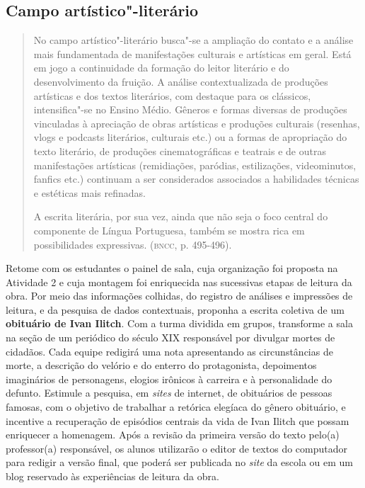 \documentclass[12pt]{extarticle}
\begin{document}
\subsection{Campo artístico"-literário}

\begin{quote}
No campo artístico"-literário busca"-se a ampliação do contato e a
análise mais fundamentada de manifestações culturais e artísticas em
geral. Está em jogo a continuidade da formação do leitor literário e do
desenvolvimento da fruição. A análise contextualizada de produções
artísticas e dos textos literários, com destaque para os clássicos,
intensifica"-se no Ensino Médio. Gêneros e formas diversas de produções
vinculadas à apreciação de obras artísticas e produções culturais
(resenhas, vlogs e podcasts literários, culturais etc.) ou a formas de
apropriação do texto literário, de produções cinematográficas e teatrais
e de outras manifestações artísticas (remidiações, paródias,
estilizações, videominutos, fanfics etc.) continuam a ser considerados
associados a habilidades técnicas e estéticas mais refinadas.

A escrita literária, por sua vez, ainda que não seja o foco central do
componente de Língua Portuguesa, também se mostra rica em possibilidades
expressivas. (\textsc{bncc}, p. 495-496).
\end{quote}

Retome com os estudantes o painel de sala, cuja organização foi
proposta na Atividade 2 e cuja montagem foi enriquecida nas sucessivas
etapas de leitura da obra. Por meio das informações colhidas, do
registro de análises e impressões de leitura, e da pesquisa de dados
contextuais, proponha a escrita coletiva de um \textbf{obituário de
Ivan Ilitch}. Com a turma dividida em grupos, transforme a sala na
seção de um periódico do século XIX responsável por divulgar mortes de
cidadãos. Cada equipe redigirá uma nota apresentando as circunstâncias
de morte, a descrição do velório e do enterro do protagonista,
depoimentos imaginários de personagens, elogios irônicos à carreira e
à personalidade do defunto. Estimule a pesquisa, em \emph{sites} de
internet, de obituários de pessoas famosas, com o objetivo de
trabalhar a retórica elegíaca do gênero obituário, e incentive a
recuperação de episódios centrais da vida de Ivan Ilitch que possam
enriquecer a homenagem. Após a revisão da primeira versão do texto
pelo(a) professor(a) responsável, os alunos utilizarão o editor de
textos do computador para redigir a versão final, que poderá ser
publicada no \emph{site} da escola ou em um blog reservado às
experiências de leitura da obra.
\end{document}
